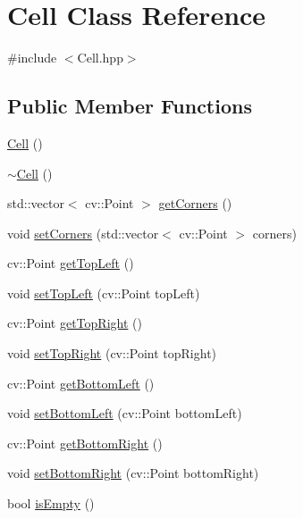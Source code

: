 \hypertarget{class_cell}{}\section{Cell Class Reference}
\label{class_cell}


{\ttfamily \#include $<$Cell.\+hpp$>$}

\subsection*{Public Member Functions}
\begin{DoxyCompactItemize}
\item 
\mbox{\hyperlink{class_cell_a394510643e8664cf12b5efaf5cb99f71}{Cell}} ()
\item 
\mbox{\hyperlink{class_cell_a9fa559f7a28e2b4336c6879ca09304d8}{$\sim$\+Cell}} ()
\item 
std\+::vector$<$ cv\+::\+Point $>$ \mbox{\hyperlink{class_cell_a03becce6b307d86848e9563eb08ac2b3}{get\+Corners}} ()
\item 
void \mbox{\hyperlink{class_cell_a6d1ad0f2766cdd641ba0e65f8b3c9555}{set\+Corners}} (std\+::vector$<$ cv\+::\+Point $>$ corners)
\item 
cv\+::\+Point \mbox{\hyperlink{class_cell_ac6e9338748b2098e034641c88a977b23}{get\+Top\+Left}} ()
\item 
void \mbox{\hyperlink{class_cell_a9e2d13652a170ef25265a41dfe39e93f}{set\+Top\+Left}} (cv\+::\+Point top\+Left)
\item 
cv\+::\+Point \mbox{\hyperlink{class_cell_a4b08bffc22a4393fd86c9608d9723d7c}{get\+Top\+Right}} ()
\item 
void \mbox{\hyperlink{class_cell_a245afe36e263e2fbf66880e4ea628f40}{set\+Top\+Right}} (cv\+::\+Point top\+Right)
\item 
cv\+::\+Point \mbox{\hyperlink{class_cell_a1946142c5e112176e1cd20cc6d07f831}{get\+Bottom\+Left}} ()
\item 
void \mbox{\hyperlink{class_cell_a86387a50a4c3f641eede253ce6cfcddb}{set\+Bottom\+Left}} (cv\+::\+Point bottom\+Left)
\item 
cv\+::\+Point \mbox{\hyperlink{class_cell_afa1704102095fd55ac036f7d290eed05}{get\+Bottom\+Right}} ()
\item 
void \mbox{\hyperlink{class_cell_ae68ff90cfde34cec208e8e74ce3f2745}{set\+Bottom\+Right}} (cv\+::\+Point bottom\+Right)
\item 
bool \mbox{\hyperlink{class_cell_a6c7344ef2aa917e70364221bf86ff8bc}{is\+Empty}} ()
\item 

\end{DoxyCompactItemize}
